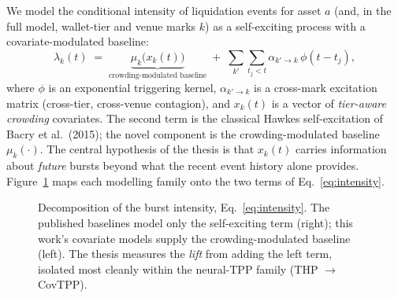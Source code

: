 \documentclass[11pt,a4paper]{article}
\begin{document}
We model the conditional intensity of liquidation events for asset $a$ (and, in the full model, wallet-tier and venue marks $k$) as a self-exciting process with a covariate-modulated baseline:
\begin{equation}
\lambda_k(t) \;=\; \underbrace{\mu_k\!\big(x_k(t)\big)}_{\text{crowding-modulated baseline}} \;+\; \sum_{k'}\sum_{t_j < t} \alpha_{k'\to k}\,\phi(t - t_j),
\label{eq:intensity}
\end{equation}
where $\phi$ is an exponential triggering kernel, $\alpha_{k'\to k}$ is a cross-mark excitation matrix (cross-tier, cross-venue contagion), and $x_k(t)$ is a vector of \emph{tier-aware crowding} covariates. The second term is the classical Hawkes self-excitation of Bacry et al.\ (2015); the novel component is the crowding-modulated baseline $\mu_k(\cdot)$. The central hypothesis of the thesis is that $x_k(t)$ carries information about \emph{future} bursts beyond what the recent event history alone provides. Figure~\ref{fig:intensity} maps each modelling family onto the two terms of Eq.~\eqref{eq:intensity}.

\begin{figure}[ht]
\centering
{}
\caption{Decomposition of the burst intensity, Eq.~\eqref{eq:intensity}. The published baselines model only the self-exciting term (right); this work's covariate models supply the crowding-modulated baseline (left). The thesis measures the \emph{lift} from adding the left term, isolated most cleanly within the neural-TPP family (THP $\to$ CovTPP).}
\label{fig:intensity}
\end{figure}
\end{document}
